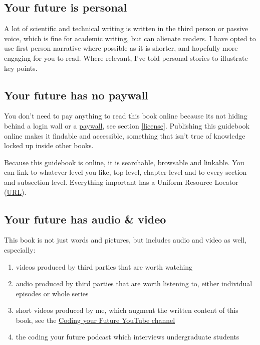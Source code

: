 \documentclass[
]{book}
\providecommand{\tightlist}{%
  \setlength{\itemsep}{0pt}\setlength{\parskip}{0pt}}
\begin{document}
\hypertarget{firstperson}{%
\subsection{Your future is personal}\label{firstperson}}

A lot of scientific and technical writing is written in the third person or passive voice, which is fine for academic writing, but can alienate readers. I have opted to use first person narrative where possible as it is shorter, and hopefully more engaging for you to read. \citep{googler} Where relevant, I've told personal stories to illustrate key points.

\hypertarget{openaccess}{%
\subsection{Your future has no paywall}\label{openaccess}}

You don't need to pay anything to read this book online because its not hiding behind a login wall or a \href{https://en.wikipedia.org/wiki/Paywall}{paywall}, see section \ref{license}. Publishing this guidebook online makes it findable and accessible, something that isn't true of knowledge locked up inside other books.

Because this guidebook is online, it is searchable, browsable and linkable. You can link to whatever level you like, top level, chapter level and to every section and subsection level. Everything important has a Uniform Resource Locator (\href{https://en.wikipedia.org/wiki/URL}{URL}).

\hypertarget{av}{%
\subsection{Your future has audio \& video}\label{av}}

This book is not just words and pictures, but includes audio and video as well, especially:

\begin{enumerate}
\def\labelenumi{\arabic{enumi}.}
\tightlist
\item
  videos produced by third parties that are worth watching
\item
  audio produced by third parties that are worth listening to, either individual episodes or whole series
\item
  short videos produced by me, which augment the written content of this book, see the \href{https://www.youtube.com/channel/UCLBv_u8JmyUPqmRALIjVnLg}{Coding your Future YouTube channel}
\item
  the coding your future podcast which interviews undergraduate students
\end{enumerate}
\end{document}
